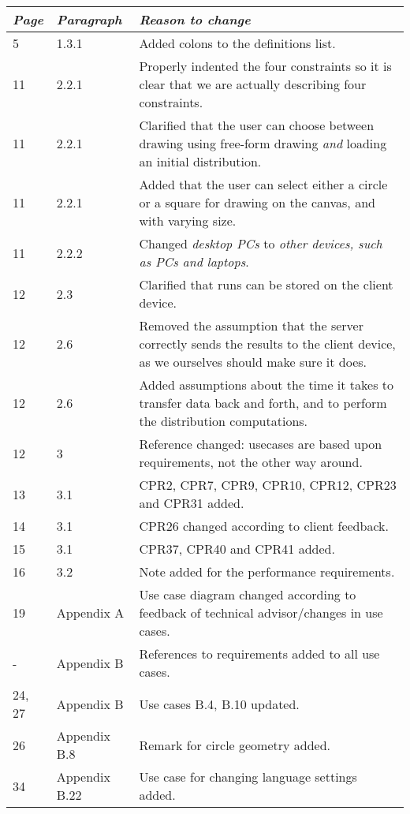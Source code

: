 \begin{longtable}{@{}llX@{}}
    \toprule
    \emph{Page} & \emph{Paragraph} & \emph{Reason to change}\\
    \midrule[1pt]
    \endhead
    5 & 1.3.1 & Added colons to the definitions list. \\
    11 & 2.2.1 & Properly indented the four constraints so it is clear that we are actually describing four constraints.\\
    11 & 2.2.1 & Clarified that the user can choose between drawing using free-form drawing \emph{and} loading an initial distribution.\\
    11 & 2.2.1 & Added that the user can select either a circle or a square for drawing on the canvas, and with varying size.\\
    11 & 2.2.2 & Changed \emph{desktop PCs} to \emph{other devices, such as PCs and laptops}.\\
    12 & 2.3   & Clarified that runs can be stored on the client device.\\ 
    12 & 2.6   & Removed the assumption that the server correctly sends the results to the client device, as we ourselves should make sure it does.\\
    12 & 2.6   & Added assumptions about the time it takes to transfer data back and forth, and to perform the distribution computations.\\
    12 & 3 & Reference changed: usecases are based upon requirements, not the other way around. \\
    13 & 3.1 & CPR2, CPR7, CPR9, CPR10, CPR12, CPR23 and CPR31 added.\\
    14 & 3.1 & CPR26 changed according to client feedback.\\
    15 & 3.1 & CPR37, CPR40 and CPR41 added.\\
    16 & 3.2 & Note added for the performance requirements.\\
    19 & Appendix A & Use case diagram changed according to feedback of technical advisor/changes in use cases.\\
    - & Appendix B & References to requirements added to all use cases.\\
    24, 27 & Appendix B & Use cases B.4, B.10 updated.\\
    26 & Appendix B.8 & Remark for circle geometry added.\\
    34 & Appendix B.22 & Use case for changing language settings added.\\
    \bottomrule
\end{longtable}